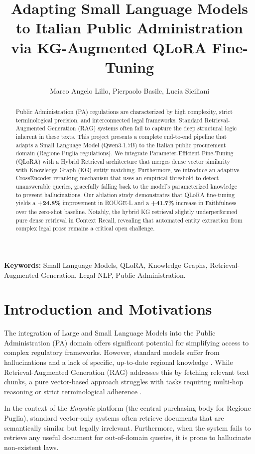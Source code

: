 \documentclass[11pt,a4paper]{article}
\title{Adapting Small Language Models to Italian Public Administration via KG-Augmented QLoRA Fine-Tuning}
\author{Marco Angelo Lillo, Pierpaolo Basile, Lucia Siciliani}
\affil{Universit\`a degli Studi di Bari, Department of Computer Science, Semantics in Intelligent Information Access Course}
\date{}
\begin{document}
\maketitle

\begin{abstract}
Public Administration (PA) regulations are characterized by high complexity, strict terminological precision, and interconnected legal frameworks. Standard Retrieval-Augmented Generation (RAG) systems often fail to capture the deep structural logic inherent in these texts. This project presents a complete end-to-end pipeline that adapts a Small Language Model (Qwen3-1.7B) to the Italian public procurement domain (Regione Puglia regulations). We integrate Parameter-Efficient Fine-Tuning (QLoRA) with a Hybrid Retrieval architecture that merges dense vector similarity with Knowledge Graph (KG) entity matching. Furthermore, we introduce an adaptive CrossEncoder reranking mechanism that uses an empirical threshold to detect unanswerable queries, gracefully falling back to the model's parameterized knowledge to prevent hallucinations. Our ablation study demonstrates that QLoRA fine-tuning yields a \textbf{+24.8\%} improvement in ROUGE-L and a \textbf{+41.7\%} increase in Faithfulness over the zero-shot baseline. Notably, the hybrid KG retrieval slightly underperformed pure dense retrieval in Context Recall, revealing that automated entity extraction from complex legal prose remains a critical open challenge.
\end{abstract}

\textbf{Keywords:} Small Language Models, QLoRA, Knowledge Graphs, Retrieval-Augmented Generation, Legal NLP, Public Administration.

\section{Introduction and Motivations}
The integration of Large and Small Language Models into the Public Administration (PA) domain offers significant potential for simplifying access to complex regulatory frameworks. However, standard models suffer from hallucinations and a lack of specific, up-to-date regional knowledge \cite{agrawal2023knowledge}. While Retrieval-Augmented Generation (RAG) \cite{lewis2020retrieval} addresses this by fetching relevant text chunks, a pure vector-based approach struggles with tasks requiring multi-hop reasoning or strict terminological adherence \cite{edge2024graphrag}.

In the context of the \textit{Empulia} platform (the central purchasing body for Regione Puglia), standard vector-only systems often retrieve documents that are semantically similar but legally irrelevant. Furthermore, when the system fails to retrieve any useful document for out-of-domain queries, it is prone to hallucinate non-existent laws. 
\end{document}

